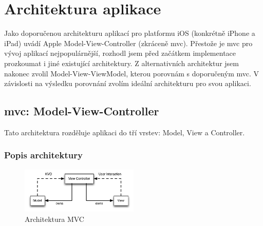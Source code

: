 \section{Architektura aplikace}\label{analyza-architektura}

Jako doporučenou architekturu aplikací pro platformu iOS (konkrétně iPhone a iPad) uvádí Apple Model-View-Controller (zkráceně \acrshort{mvc}).
Přestože je \acrshort{mvc} pro vývoj aplikací nejpopulárnější, rozhodl jsem před začátkem implementace prozkoumat i jiné existující architektury.
Z alternativních architektur jsem nakonec zvolil Model-View-ViewModel, kterou porovnám s doporučeným \acrshort{mvc}.
V závislosti na výsledku porovnání zvolím ideální architekturu pro svou aplikaci.

\subsection{\acrshort{mvc}: Model-View-Controller}\label{analyza-mvc}
Tato architektura rozděluje aplikaci do tří vrstev: Model, View a Controller.

\subsubsection*{Popis architektury}

\begin{figure}\centering
	\includegraphics[width=0.5\textwidth]{assets/mvc-architecture.png}
	\caption{Architektura MVC}\label{fig:architektura-mvc}
\end{figure}


